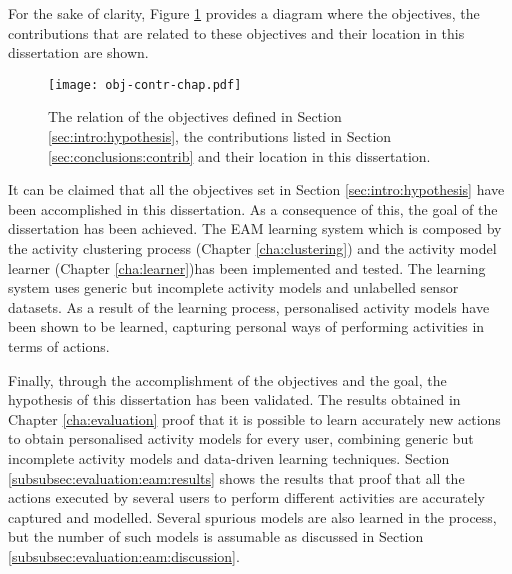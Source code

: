 For the sake of clarity, Figure \ref{fig-obj-contr-chap} provides a diagram where the objectives, the contributions that are related to these objectives and their location in this dissertation are shown.

\begin{figure}[htbp]
\centering
\texttt{[image: obj-contr-chap.pdf]}
    \caption{The relation of the objectives defined in Section \ref{sec:intro:hypothesis}, the contributions listed in Section \ref{sec:conclusions:contrib} and their location in this dissertation.}
    \label{fig-obj-contr-chap}
\end{figure}

It can be claimed that all the objectives set in Section \ref{sec:intro:hypothesis} have been accomplished in this dissertation. As a consequence of this, the goal of the dissertation has been achieved. The EAM learning system which is composed by the activity clustering process (Chapter \ref{cha:clustering}) and the activity model learner (Chapter \ref{cha:learner})has been implemented and tested. The learning system uses generic but incomplete activity models and unlabelled sensor datasets. As a result of the learning process, personalised activity models have been shown to be learned, capturing personal ways of performing activities in terms of actions.

Finally, through the accomplishment of the objectives and the goal, the hypothesis of this dissertation has been validated. The results obtained in Chapter \ref{cha:evaluation} proof that it is possible to learn accurately new actions to obtain personalised activity models for every user, combining generic but incomplete activity models and data-driven learning techniques. Section \ref{subsubsec:evaluation:eam:results} shows the results that proof that all the actions executed by several users to perform different activities are accurately captured and modelled. Several spurious models are also learned in the process, but the number of such models is assumable as discussed in Section \ref{subsubsec:evaluation:eam:discussion}.